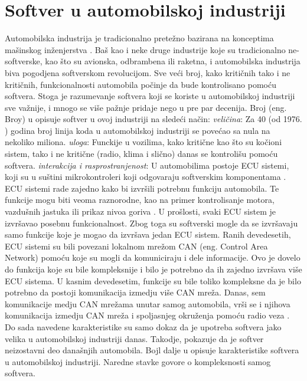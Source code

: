 \documentclass{article}
\begin{document}
\section{Softver u automobilskoj industriji}
Automobilska industrija je tradicionalno pretežno bazirana na konceptima mašinskog inženjerstva \cite{ref5}\cite{ref6}. Baš kao i neke druge industrije koje su tradicionalno ne-softverske, kao što su avionska, odbrambena ili raketna, i automobilska industrija biva pogodjena softverskom revolucijom. Sve veći broj, kako kritičnih tako i ne kritičnih, funkcionalnosti automobila počinje da bude kontrolisano pomoću softvera. Stoga je razumevanje softvera koji se koriste u automobilskoj industriji sve važnije, i mnogo se više pažnje pridaje nego u pre par decenija. Broj (eng. Broy) u \cite{ref6} opisuje softver u ovoj industriji na sledeći način:
\bigbreak
\textit{veličina}: Za 40 (od 1976. \cite{ref7}) godina broj linija koda u automobilskoj industriji se povećao sa nula na nekoliko miliona.
\bigbreak
\textit{uloga}: Funckije u vozilima, kako kritične kao što su kočioni sistem, tako i ne kritične (radio, klima i slično) danas se kontrolišu pomoću softvera. 
\bigbreak
\textit{interakcija i rasprostranjenost}: U automobilima postoje ECU sistemi, koji su u suštini mikrokontroleri koji odgovaraju softverskim komponentama \cite{nadji referencu}. ECU sistemi rade zajedno kako bi izvršili potrebnu funkciju automobila. Te funkcije mogu biti veoma raznorodne, kao na primer kontrolisanje motora, vazdušnih jastuka ili prikaz nivoa goriva \cite{ref8}. U prošlosti, svaki ECU sistem je izvršavao posebnu funkcionalnost. Zbog toga su softverski mogle da se izvršavaju samo funkcije koje je mogao da izvršava jedan ECU sistem. Ranih devedesetih, ECU sistemi su bili povezani lokalnom mrežom CAN (eng. Control Area Network) pomoću koje su mogli da komuniciraju i dele informacije. Ovo je dovelo do funkcija koje su bile kompleksnije i bilo je potrebno da ih zajedno izvršava više ECU sistema. U kasnim devedesetim, funkcije su bile toliko kompleksne da je bilo potrebno da postoji komunikacija izmedju više CAN mreža. Danas, sem komunikacije medju CAN mrežama unutar samog automobila, vrši se i njihova komunikacija izmedju CAN mreža i spoljasnjeg okruženja pomoću radio veza \cite{ref2}.
\bigbreak
Do sada navedene karakteristike su samo dokaz da je upotreba softvera jako velika u automobilskoj industriji danas. Takodje, pokazuje da je softver neizostavni deo današnjih automobila. Bojl dalje u \cite{ref7} opisuje karakteristike softvera u automobilskoj industriji. Naredne stavke govore o kompleksnosti samog softvera.
\end{document}
